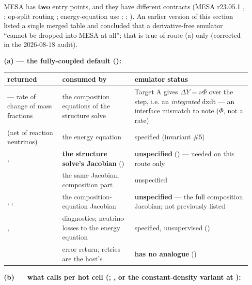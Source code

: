 MESA has \textbf{two} entry points, and they have different contracts (MESA
r23.05.1  ,
 ; op-split routing
; energy-equation use
; \citealt[\S 6]{paxton2011};
\citealt[\S 10.2]{jermyn2023}). An earlier version of this section listed a
single merged table and concluded that a derivative-free emulator ``cannot be
dropped into MESA at all''; that is true of route (a) only (corrected in the
2026-08-18 audit).

\textbf{(a)  --- the fully-coupled default
(\citealt[\S 6]{paxton2011}):}

\begingroup\small
\begin{tabularx}{\textwidth}{@{}L{3.6cm} L{4.6cm} Y@{}}
\toprule
\textbf{returned} & \textbf{consumed by} & \textbf{emulator status} \\
\midrule
{} --- rate of change of mass fractions &
  the composition equations of the structure solve &
  Target A gives $\Delta Y = \nu\Phi$ over the step, i.e. an \emph{integrated}
  dxdt --- an interface mismatch to note ($\Phi$, not a rate) \\
 (net of reaction neutrinos) &
  the energy equation &
  specified (invariant \#5) \\
,  &
  \textbf{the structure solve's Jacobian} () &
  \textbf{unspecified} () --- needed on this route only \\
 &
  the same Jacobian, composition part &
  unspecified \\
, ,  &
  the composition-equation Jacobian &
  \textbf{unspecified} --- the full composition Jacobian; not previously
  listed \\
,  &
  diagnostics; neutrino losses to the energy equation &
  specified, unsupervised () \\
 &
  error return; retries are the host's &
  \textbf{has no analogue} () \\
\bottomrule
\end{tabularx}
\endgroup

\textbf{(b)  --- what  calls per
hot cell (\citealt[\S 10.2]{jermyn2023}; , or
the constant-density variant at ):}

